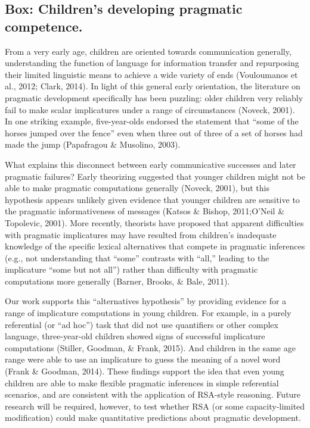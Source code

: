 \documentclass[]{elsarticle}
\begin{document}
\subsection{Box: Children's developing pragmatic competence.
}\label{box-childrens-developing-pragmatic-competence.}

From a very early age, children are oriented towards communication
generally, understanding the function of language for information
transfer and repurposing their limited linguistic means to achieve a
wide variety of ends (Vouloumanos et al., 2012; Clark, 2014). In light
of this general early orientation, the literature on pragmatic
development specifically has been puzzling: older children very reliably
fail to make scalar implicatures under a range of circumstances (Noveck,
2001). In one striking example, five-year-olds endorsed the statement
that ``some of the horses jumped over the fence'' even when three out of
three of a set of horses had made the jump (Papafragou \& Musolino,
2003).

What explains this disconnect between early communicative successes and
later pragmatic failures? Early theorizing suggested that younger
children might not be able to make pragmatic computations generally
(Noveck, 2001), but this hypothesis appears unlikely given evidence that
younger children are sensitive to the pragmatic informativeness of
messages (Katsos \& Bishop, 2011;O'Neil \& Topolevic, 2001). More
recently, theorists have proposed that apparent difficulties with
pragmatic implicatures may have resulted from children's inadequate
knowledge of the specific lexical alternatives that compete in pragmatic
inferences (e.g., not understanding that ``some'' contrasts with
``all,'' leading to the implicature ``some but not all'') rather than
difficulty with pragmatic computations more generally (Barner, Brooks,
\& Bale, 2011).

Our work supports this ``alternatives hypothesis'' by providing evidence
for a range of implicature computations in young children. For example,
in a purely referential (or ``ad hoc'') task that did not use
quantifiers or other complex language, three-year-old children showed
signs of successful implicature computations (Stiller, Goodman, \&
Frank, 2015). And children in the same age range were able to use an
implicature to guess the meaning of a novel word (Frank \& Goodman,
2014). These findings support the idea that even young children are able
to make flexible pragmatic inferences in simple referential scenarios,
and are consistent with the application of RSA-style reasoning. Future
research will be required, however, to test whether RSA (or some
capacity-limited modification) could make quantitative predictions about
pragmatic development.
\end{document}
